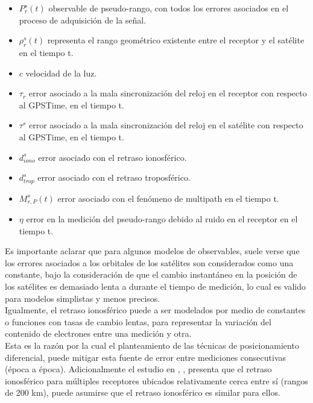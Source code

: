 \begin{itemize}[label=]
	\item $P_{r}^{s}(t)$ observable de pseudo-rango, con todos los errores asociados en el proceso de adquisición de la señal.
	\item $\rho_{r}^{s}(t)$ representa el rango geométrico existente entre el receptor y el satélite en el tiempo t.
	\item $c$ velocidad de la luz.
	\item $\tau_{r}$ error asociado a la mala sincronización del reloj en el receptor con respecto al GPSTime, en el tiempo t.
	\item $\tau^{s}$ error asociado a la mala sincronización del reloj en el satélite con respecto al GPSTime, en el tiempo t.
	\item $d_{iono}^{s}$ error asociado con el retraso ionosférico.
	\item $d_{trop}^{s}$ error asociado con el retraso troposférico.
	\item $M_{r,P}^{s}(t)$ error asociado con el fenómeno de multipath en el tiempo t.
	\item $\eta$ error en la medición del pseudo-rango debido al ruido en el receptor en el tiempo t.
\end{itemize}

Es importante aclarar que para algunos modelos de observables, suele verse que los errores asociados a los orbitales de los satélites son considerados como una constante, bajo la consideración de que el cambio instantáneo en la posición de los satélites es demasiado lenta a durante el tiempo de medición, lo cual es valido para modelos simplistas y menos precisos.\\

Igualmente, el retraso ionosférico puede a ser modelados por medio de constantes o funciones con tasas de cambio lentas, para representar la variación del contenido de electrones entre una medición y otra.\\

Esta es la razón por la cual el planteamiento de las técnicas de posicionamiento diferencial, puede mitigar esta fuente de error entre mediciones consecutivas (época a época). Adicionalmente el estudio en \cite{el1994effect}, \cite{blewitt1997basics}, presenta que el retraso ionosférico para múltiples receptores ubicados relativamente cerca entre sí (rangos de 200 km), puede asumirse que el retraso ionosférico es similar para ellos.

